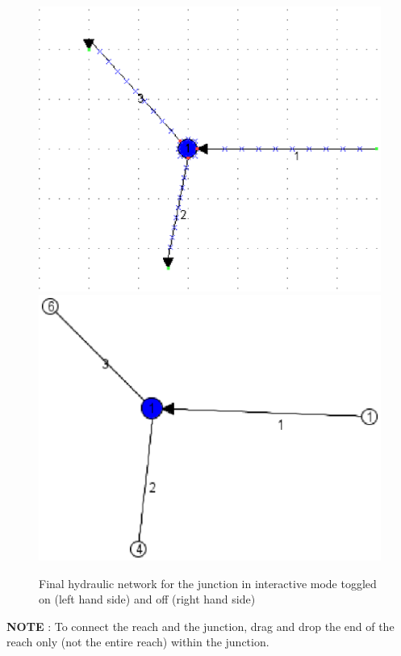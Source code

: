 \documentclass[a4paper,12pt]{article}
\begin{document}
\begin{figure}[h]
  \begin{center}
  \includegraphics[scale=0.4]{final_junction}\includegraphics[scale=0.4]{final_junction_2}
  \caption{Final hydraulic network for the junction in interactive mode toggled on (left hand side) and off (right hand side)}
  \label{fig:Final-junction}
  \end{center}
\end{figure}

\textbf{NOTE} : To connect the reach and the junction, drag and drop the end of the reach only (not the entire reach) within the junction.
\end{document}
